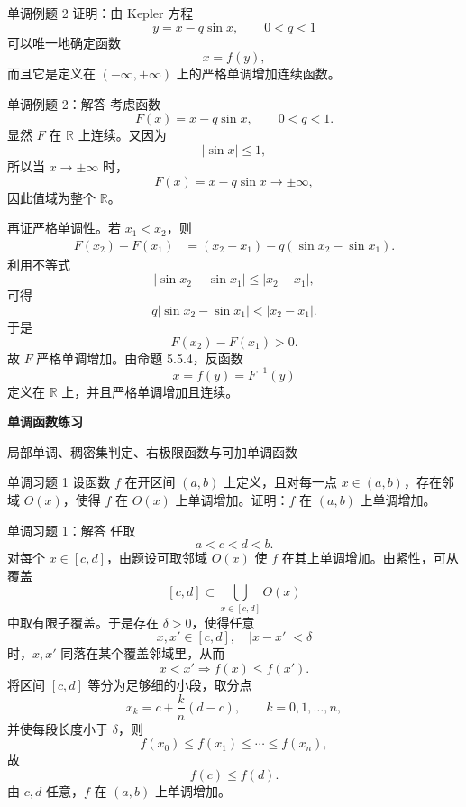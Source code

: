 ﻿\documentclass[aspectratio=169,11pt]{ctexbeamer}
\newcommand{\R}{\mathbb{R}}
\begin{document}
\begin{frame}{单调例题 2}
证明：由 Kepler 方程
\[
  y=x-q\sin x,\qquad 0<q<1
\]
可以唯一地确定函数
\[
  x=f(y),
\]
而且它是定义在 $(-\infty,+\infty)$ 上的严格单调增加连续函数。
\end{frame}

\begin{frame}[allowframebreaks]{单调例题 2：解答}
考虑函数
\[
  F(x)=x-q\sin x,\qquad 0<q<1.
\]
显然 $F$ 在 $\R$ 上连续。又因为
\[
  |\sin x|\le 1,
\]
所以当 $x\to\pm\infty$ 时，
\[
  F(x)=x-q\sin x\to\pm\infty,
\]
因此值域为整个 $\R$。
\vspace{0.5em}

再证严格单调性。若 $x_1<x_2$，则
\begin{align*}
  F(x_2)-F(x_1)
  &=(x_2-x_1)-q(\sin x_2-\sin x_1).
\end{align*}
利用不等式
\[
  |\sin x_2-\sin x_1|\le |x_2-x_1|,
\]
可得
\[
  q|\sin x_2-\sin x_1|<|x_2-x_1|.
\]
于是
\[
  F(x_2)-F(x_1)>0.
\]
故 $F$ 严格单调增加。由命题 5.5.4，反函数
\[
  x=f(y)=F^{-1}(y)
\]
定义在 $\R$ 上，并且严格单调增加且连续。
\end{frame}

\begin{frame}
  \centering
  \vspace{1.2cm}
  {\LARGE \bfseries 单调函数练习}
  \vspace{0.8cm}

  {\large 局部单调、稠密集判定、右极限函数与可加单调函数}
\end{frame}

\begin{frame}{单调习题 1}
设函数 $f$ 在开区间 $(a,b)$ 上定义，且对每一点 $x\in(a,b)$，存在邻域 $O(x)$，使得 $f$ 在 $O(x)$ 上单调增加。证明：$f$ 在 $(a,b)$ 上单调增加。
\end{frame}

\begin{frame}[allowframebreaks]{单调习题 1：解答}
任取
\[
  a<c<d<b.
\]
对每个 $x\in[c,d]$，由题设可取邻域 $O(x)$ 使 $f$ 在其上单调增加。由紧性，可从覆盖
\[
  [c,d]\subset \bigcup_{x\in[c,d]} O(x)
\]
中取有限子覆盖。于是存在 $\delta>0$，使得任意
\[
  x,x'\in[c,d],\quad |x-x'|<\delta
\]
时，$x,x'$ 同落在某个覆盖邻域里，从而
\[
  x<x' \Longrightarrow f(x)\le f(x').
\]
将区间 $[c,d]$ 等分为足够细的小段，取分点
\[
  x_k=c+\frac{k}{n}(d-c),\qquad k=0,1,\dots,n,
\]
并使每段长度小于 $\delta$，则
\[
  f(x_0)\le f(x_1)\le \cdots\le f(x_n),
\]
故
\[
  f(c)\le f(d).
\]
由 $c,d$ 任意，$f$ 在 $(a,b)$ 上单调增加。
\end{frame}
\end{document}
